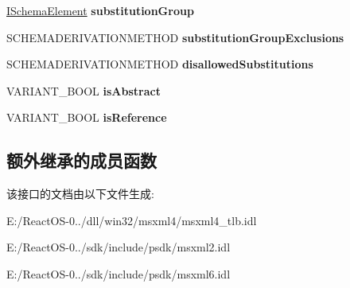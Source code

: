 \begin{DoxyCompactItemize}
\mbox{\label{interface_m_s_x_m_l2_1_1_i_schema_element_a7d5e9989b5bd5ffd4ba5ae86d9872299}} 
\hyperlink{interface_m_s_x_m_l2_1_1_i_schema_element}{I\+Schema\+Element} {\bfseries substitution\+Group}
\item 
\mbox{\label{interface_m_s_x_m_l2_1_1_i_schema_element_aefc862c9d5a238d8bdefcda28e8d8e0f}} 
S\+C\+H\+E\+M\+A\+D\+E\+R\+I\+V\+A\+T\+I\+O\+N\+M\+E\+T\+H\+OD {\bfseries substitution\+Group\+Exclusions}
\item 
\mbox{\label{interface_m_s_x_m_l2_1_1_i_schema_element_a2f8915da6bf66560a5ba5646750d3c14}} 
S\+C\+H\+E\+M\+A\+D\+E\+R\+I\+V\+A\+T\+I\+O\+N\+M\+E\+T\+H\+OD {\bfseries disallowed\+Substitutions}
\item 
\mbox{\label{interface_m_s_x_m_l2_1_1_i_schema_element_ae18afb7b45be92cbd30a462cdd5380a3}} 
V\+A\+R\+I\+A\+N\+T\+\_\+\+B\+O\+OL {\bfseries is\+Abstract}
\item 
\mbox{\label{interface_m_s_x_m_l2_1_1_i_schema_element_a616b80966850d9cc009cf192cffb80a8}} 
V\+A\+R\+I\+A\+N\+T\+\_\+\+B\+O\+OL {\bfseries is\+Reference}
\end{DoxyCompactItemize}
\subsection*{额外继承的成员函数}


该接口的文档由以下文件生成\+:\begin{DoxyCompactItemize}
\item 
E\+:/\+React\+O\+S-\/0../dll/win32/msxml4/msxml4\+\_\+tlb.\+idl\item 
E\+:/\+React\+O\+S-\/0../sdk/include/psdk/msxml2.\+idl\item 
E\+:/\+React\+O\+S-\/0../sdk/include/psdk/msxml6.\+idl\end{DoxyCompactItemize}
